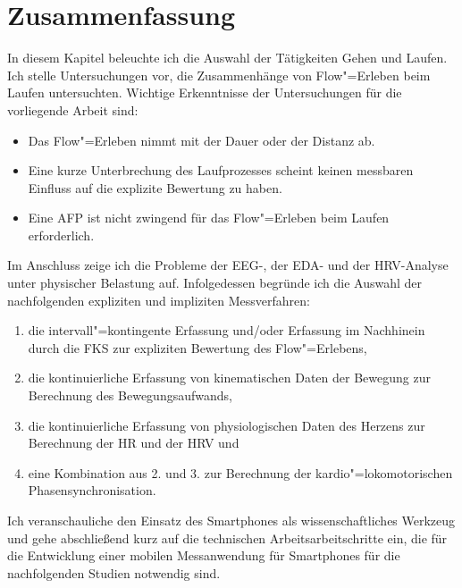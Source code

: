 

\section{Zusammenfassung} 

\label{sec:zusammenfassung_4}

In diesem Kapitel beleuchte ich die Auswahl der Tätigkeiten Gehen und Laufen. Ich stelle Untersuchungen vor, die Zusammenhänge von Flow"=Erleben beim Laufen untersuchten. Wichtige Erkenntnisse der Untersuchungen für die vorliegende Arbeit sind: 
\begin{itemize}

	\item Das Flow"=Erleben nimmt mit der Dauer oder der Distanz ab.

	\item Eine kurze Unterbrechung des Laufprozesses scheint keinen messbaren Einfluss auf die explizite Bewertung zu haben. 

	\item Eine \ac{AFP} ist nicht zwingend für das Flow"=Erleben beim Laufen erforderlich.
	
\end{itemize}

	Im Anschluss zeige ich die Probleme der \acs{EEG}-, der \ac{EDA}- und der \acs{HRV}-Analyse unter physischer Belastung auf. Infolgedessen begründe ich die Auswahl der nachfolgenden expliziten und impliziten Messverfahren:
	
\begin{enumerate}

	\item die intervall"=kontingente Erfassung und/oder Erfassung im Nachhinein durch die \ac{FKS} zur expliziten Bewertung des Flow"=Erlebens, 

	\item die kontinuierliche Erfassung von kinematischen Daten der Bewegung zur Berechnung des Bewegungsaufwands, 

	\item die kontinuierliche Erfassung von physiologischen Daten des Herzens zur Berechnung der \ac{HR} und der \acs{HRV} und 

	\item eine Kombination aus 2. und 3. zur Berechnung der kardio"=lokomotorischen Phasensynchronisation.
\end{enumerate}

Ich veranschauliche den Einsatz des Smartphones als wissenschaftliches Werkzeug und gehe abschließend kurz auf die technischen Arbeitsarbeitschritte ein, die für die Entwicklung einer mobilen Messanwendung für Smartphones für die nachfolgenden Studien notwendig sind.

